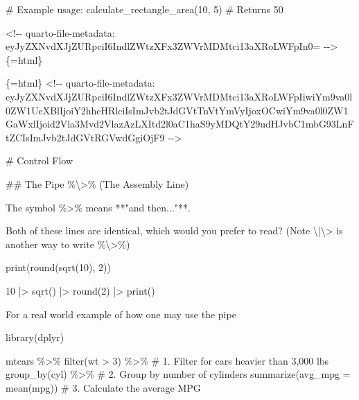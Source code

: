\documentclass[
  letterpaper,
  DIV=11,
  numbers=noendperiod,
  oneside]{scrreprt}
\newenvironment{Shaded}{\begin{snugshade}}{\end{snugshade}}
\newcommand{\FunctionTok}[1]{\textcolor[rgb]{0.28,0.35,0.67}{#1}}
\newcommand{\InformationTok}[1]{\textcolor[rgb]{0.37,0.37,0.37}{#1}}
\newcommand{\NormalTok}[1]{\textcolor[rgb]{0.00,0.23,0.31}{#1}}
\newcommand{\SpecialCharTok}[1]{\textcolor[rgb]{0.37,0.37,0.37}{#1}}
\begin{document}
\begin{Shaded}
\begin{Highlighting}[numbers=left,,]
\InformationTok{\# Example usage:}
\InformationTok{calculate\_rectangle\_area(10, 5) \# Returns 50}
\InformationTok{\textasciigrave{}\textasciigrave{}\textasciigrave{}}


\InformationTok{\textasciigrave{}\textless{}!{-}{-} quarto{-}file{-}metadata: eyJyZXNvdXJjZURpciI6IndlZWtzXFx3ZWVrMDMtci13aXRoLWFpIn0= {-}{-}\textgreater{}\textasciigrave{}}\NormalTok{\{=html\}}

\InformationTok{\textasciigrave{}\textasciigrave{}\textasciigrave{}\{=html\}}
\InformationTok{\textless{}!{-}{-} quarto{-}file{-}metadata: eyJyZXNvdXJjZURpciI6IndlZWtzXFx3ZWVrMDMtci13aXRoLWFpIiwiYm9va0l0ZW1UeXBlIjoiY2hhcHRlciIsImJvb2tJdGVtTnVtYmVyIjoxOCwiYm9va0l0ZW1GaWxlIjoid2Vla3Mvd2VlazAzLXItd2l0aC1haS9yMDQtY29udHJvbC1mbG93LnFtZCIsImJvb2tJdGVtRGVwdGgiOjF9 {-}{-}\textgreater{}}
\InformationTok{\textasciigrave{}\textasciigrave{}\textasciigrave{}}

\FunctionTok{\# Control Flow }


\FunctionTok{\#\# The Pipe \%\textbackslash{}\textgreater{}\% (The Assembly Line)}

\NormalTok{The symbol }\InformationTok{\textasciigrave{}\%\textgreater{}\%\textasciigrave{}}\NormalTok{ means **"and then..."**.}

\NormalTok{Both of these lines are identical, which would you prefer to read? (Note }\SpecialCharTok{\textbackslash{}|\textbackslash{}\textgreater{}}\NormalTok{ is another way to write \%}\SpecialCharTok{\textbackslash{}\textgreater{}}\NormalTok{\%)}

\InformationTok{\textasciigrave{}\textasciigrave{}\textasciigrave{}         }
\InformationTok{print(round(sqrt(10), 2))}

\InformationTok{10 |\textgreater{} sqrt() |\textgreater{} round(2) |\textgreater{} print()}
\InformationTok{\textasciigrave{}\textasciigrave{}\textasciigrave{}}

\NormalTok{For a real world example of how one may use the pipe}

\InformationTok{\textasciigrave{}\textasciigrave{}\textasciigrave{}         }
\InformationTok{library(dplyr)}

\InformationTok{mtcars \%\textgreater{}\%}
\InformationTok{  filter(wt \textgreater{} 3) \%\textgreater{}\%          \# 1. Filter for cars heavier than 3,000 lbs}
\InformationTok{  group\_by(cyl) \%\textgreater{}\%           \# 2. Group by number of cylinders}
\InformationTok{  summarize(avg\_mpg = mean(mpg)) \# 3. Calculate the average MPG}
\InformationTok{\textasciigrave{}\textasciigrave{}\textasciigrave{}}


\end{Highlighting}
\end{Shaded}
\end{document}
